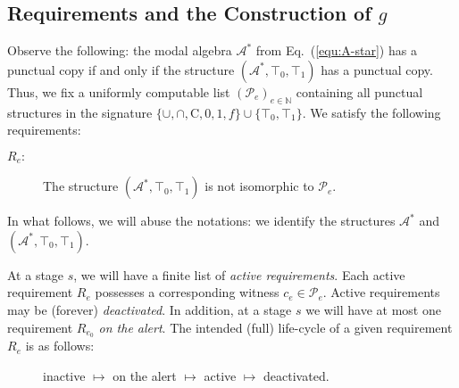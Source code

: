 \documentclass[a4paper,UKenglish,cleveref, autoref, thm-restate]{lipics-v2021}
\begin{document}
\subsection{Requirements and the Construction of $g$}

Observe the following: the modal algebra $\mathcal{A}^{\ast}$ from Eq.~(\ref{equ:A-star}) has a punctual copy if and only if the structure $(\mathcal{A}^{\ast}, \top_0, \top_1)$ has a punctual copy. 
Thus, we fix a uniformly computable list $(\mathcal{P}_e)_{e\in\mathbb{N}}$ containing all punctual structures in the signature $\{ \cup,\cap, \mathrm{C},0,1,f\} \cup \{ \top_0,\top_1\}$. We satisfy the following requirements:
\begin{description}
	\item[$R_e:$] The structure $(\mathcal{A}^{\ast}, \top_0,\top_1)$ is not isomorphic to $\mathcal{P}_e$.
\end{description}
In what follows, we will abuse the notations: we identify the structures $\mathcal{A}^{\ast}$ and $(\mathcal{A}^{\ast},\top_0,\top_1)$.

At a stage $s$, we will have a finite list of \emph{active requirements}. Each active requirement $R_e$ possesses a corresponding witness $c_e \in \mathcal{P}_e$. Active requirements may be (forever) \emph{deactivated}. In addition, at a stage $s$ we will have at most one requirement $R_{e_0}$ \emph{on the alert}. 
The intended (full) life-cycle of a given requirement $R_e$ is as follows:
\begin{description}
\item[] inactive $\mapsto$ on the alert $\mapsto$ active $\mapsto$ deactivated.
\end{description}
\end{document}
